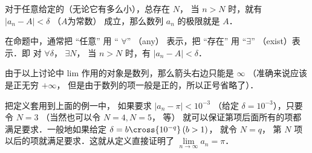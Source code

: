 对于任意给定的（无论它有多么小），总存在 $N$， 当 $n>N$ 时，就有 $\left| {{a_n} - A} \right| < \delta $ （$A$为常数） 成立，那么数列 $a_n$ 的极限就是 $A$． 

在命题中，通常把 “任意” 用 “ $\forall$” （any） 表示，把 “存在” 用 “$\exists $” （exist）表示．即
对 $\forall \delta$， $\exists N$， 当 $n>N$ 时，有 $\left| {{a_n} - A} \right| < \delta$． 

由于以上讨论中 lim 作用的对象是数列，那么箭头右边只能是 $\infty$ （准确来说应该是正无穷 $+\infty$， 但是由于数列的项一般是正的，所以正号省略了）．

把定义套用到上面的例一中， 如果要求 $\left| {{a_n} - \pi } \right| < {10^{ - 3}}$ （给定 $\delta  = {10^{ - 3}}$），只要令 $N=3$ （当然也可以令 $N=4, N=5$， 等） 就可以保证第项后面所有的项都满足要求．一般地如果给定 $\delta  = b \cross {10^{ - q}}  \left( {b > 1} \right)$， 就令 $N = q$， 第 $N$ 项以后的项就满足要求．这就从定义直接证明了 $\mathop {\lim }\limits_{n \to \infty } {a_n} = \pi $． 


